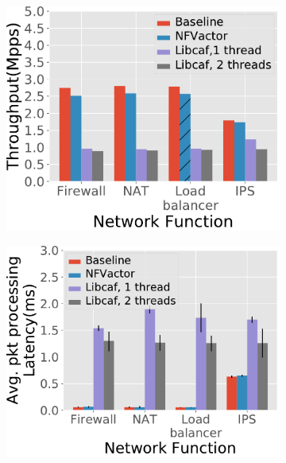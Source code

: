 \begin{figure}[!h]
  \begin{subfigure}[t]{0.49\linewidth}
    \centering
    \includegraphics[width=\columnwidth]{chap-nfvactor/exp-figure/micro_throughput.pdf}
    \caption{}\label{fig:micro_throughput}
  \end{subfigure}\hfill
  \begin{subfigure}[t]{0.49\linewidth}
    \centering
    \includegraphics[width=\columnwidth]{chap-nfvactor/exp-figure/micro_latency.pdf}
    \caption{}\label{fig:micro_latency}
  \end{subfigure}\hfill
  \begin{subfigure}[t]{0.49\linewidth}

\end{subfigure}
\end{figure}
